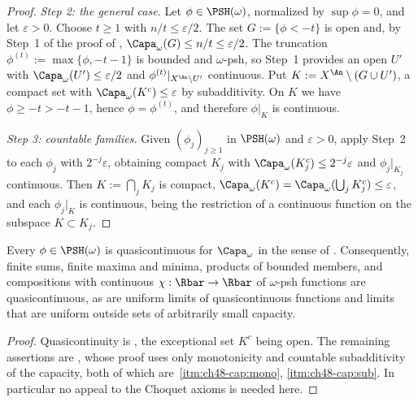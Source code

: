 \begin{proof}
\emph{Step 2: the general case.}  Let $\phi\in\PSH(\omega)$, normalized
by $\sup\phi=0$, and let $\varepsilon>0$.  Choose $t\ge1$ with
$n/t\le\varepsilon/2$.  The set $G:=\{\phi<-t\}$ is open and, by
Step~1 of the proof of ,
$\Capa_\omega(G)\le n/t\le\varepsilon/2$.  The truncation
$\phi^{(t)}:=\max\{\phi,-t-1\}$ is bounded and $\omega$-psh, so Step~1
provides an open $U'$ with $\Capa_\omega(U')\le\varepsilon/2$ and
$\phi^{(t)}|_{X^{\An}\setminus U'}$ continuous.  Put
$K:=X^{\An}\setminus(G\cup U')$, a compact set with
$\Capa_\omega(K^c)\le\varepsilon$ by subadditivity.  On $K$ we have
$\phi\ge-t>-t-1$, hence $\phi=\phi^{(t)}$, and therefore
$\phi|_K$ is continuous.

\emph{Step 3: countable families.}  Given $(\phi_j)_{j\ge1}$ in
$\PSH(\omega)$ and $\varepsilon>0$, apply Step~2 to each $\phi_j$
with $2^{-j}\varepsilon$, obtaining compact $K_j$ with
$\Capa_\omega(K_j^c)\le2^{-j}\varepsilon$ and $\phi_j|_{K_j}$
continuous.  Then $K:=\bigcap_jK_j$ is compact,
$\Capa_\omega(K^c)=\Capa_\omega(\bigcup_jK_j^c)\le\varepsilon$, and each
$\phi_j|_K$ is continuous, being the restriction of a continuous function
on the subspace $K\subset K_j$.
\end{proof}

\begin{corollary}
\label{cor:ch48-qc-calculus}
Every $\phi\in\PSH(\omega)$ is quasicontinuous for $\Capa_\omega$ in
the sense of .  Consequently, finite sums,
finite maxima and minima, products of bounded members, and compositions
with continuous $\chi:\Rbar\to\Rbar$ of $\omega$-psh functions are
quasicontinuous, as are uniform limits of quasicontinuous functions and
limits that are uniform outside sets of arbitrarily small capacity.
\end{corollary}

\begin{proof}
Quasicontinuity is , the exceptional set
$K^c$ being open.  The remaining assertions are
, whose proof uses only monotonicity
and countable subadditivity of the capacity, both of which are
\,\cref{itm:ch48-cap:mono},
\cref{itm:ch48-cap:sub}.  In particular no appeal to the Choquet axioms
\cite[Theorem~13.29]{BJ22} is needed here.
\end{proof}

